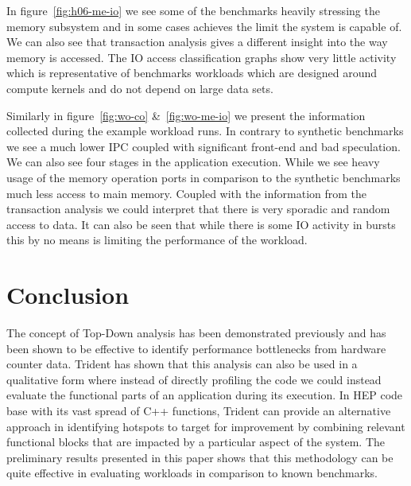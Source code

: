 \documentclass{webofc}
\begin{document}
In figure~\ref{fig:h06-me-io} we see some of the benchmarks heavily stressing the memory subsystem and in some cases achieves the limit the system is capable of. We can also see that transaction analysis gives a different insight into the way memory is accessed. The IO access classification graphs show very little activity which is representative of benchmarks workloads which are designed around compute kernels and do not depend on large data sets.

Similarly in figure~\ref{fig:wo-co} \&~\ref{fig:wo-me-io} we present the information collected during the example workload runs. In contrary to synthetic benchmarks we see a much lower IPC coupled with significant front-end and bad speculation. We can also see four stages in the application execution. While we see heavy usage of the memory operation ports in comparison to the synthetic benchmarks much less access to main memory. Coupled with the information from the transaction analysis we could interpret that there is very sporadic and random access to data. It can also be seen that while there is some IO activity in bursts this by no means is limiting the performance of the workload.


\section{Conclusion}

The concept of Top-Down analysis has been demonstrated previously and has been shown to be effective to identify performance bottlenecks from hardware counter data. Trident has shown that this analysis can also be used in a qualitative form where instead of directly profiling the code we could instead evaluate the functional parts of an application during its execution. In HEP code base with its vast spread of C++ functions, Trident can provide an alternative approach in identifying hotspots to target for improvement by combining relevant functional blocks that are impacted by a particular aspect of the system. The preliminary results presented in this paper shows that this methodology can be quite effective in evaluating workloads in comparison to known benchmarks.


\end{document}
